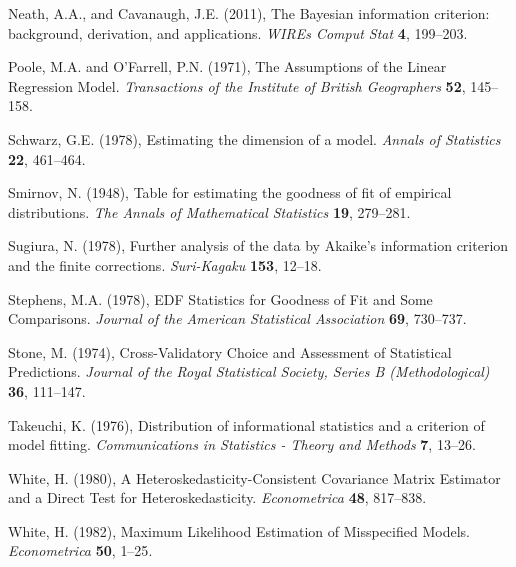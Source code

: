 \phantom{a}

\rff Neath, A.A., and Cavanaugh, J.E. (2011),
      The Bayesian information criterion: background, derivation, and applications.
      {\it WIREs Comput Stat}
      {\bf 4}, {199--203}.

\phantom{a}

\rff Poole, M.A. and O'Farrell, P.N. (1971),
      The Assumptions of the Linear Regression Model.
      {\it Transactions of the Institute of British Geographers}
      {\bf 52}, {145--158}.

\phantom{a}

\rff Schwarz, G.E. (1978),
      Estimating the dimension of a model.
      {\it Annals of Statistics}
      {\bf 22}, {461--464}.

\phantom{a}

\rff Smirnov, N. (1948),
    Table for estimating the goodness of fit of empirical distributions.
    {\it The Annals of Mathematical Statistics}
    {\bf 19}, {279--281}.

\phantom{a}

\rff Sugiura, N. (1978),
      Further analysis of the data by Akaike's information criterion and the finite corrections.
      {\it Suri-Kagaku}
      {\bf 153}, {12--18}.

\phantom{a}

\rff Stephens, M.A. (1978),
      EDF Statistics for Goodness of Fit and Some Comparisons.
      {\it Journal of the American Statistical Association}
      {\bf 69}, {730--737}.

\phantom{a}

\rff Stone, M. (1974),
      Cross-Validatory Choice and Assessment of Statistical Predictions.
      {\it Journal of the Royal Statistical Society, Series B (Methodological)}
      {\bf 36}, {111--147}.

\phantom{a}

\rff Takeuchi, K. (1976),
      Distribution of informational statistics and a criterion of model fitting.
      {\it Communications in Statistics - Theory and Methods}
      {\bf 7}, {13--26}.

\phantom{a}

\rff White, H. (1980),
      A Heteroskedasticity-Consistent Covariance Matrix Estimator and a Direct Test for Heteroskedasticity.
      {\it Econometrica}
      {\bf 48}, {817--838}.

\phantom{a}

\rff White, H. (1982),
      Maximum Likelihood Estimation of Misspecified Models.
      {\it Econometrica}
      {\bf 50}, {1--25}.


